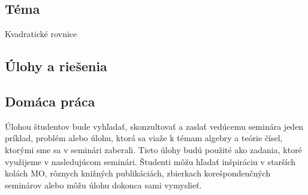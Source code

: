 
\subsection*{Téma}
Kvadratické rovnice

\subsection*{Úlohy a riešenia}















\subsection*{Domáca práca}

Úlohou študentov bude vyhľadať, skonzultovať a zaslať vedúcemu seminára jeden príklad, problém alebo úlohu, ktorá sa viaže k témam algebry a teórie čísel, ktorými sme sa v seminári zaberali. Tieto úlohy budú použité ako zadania, ktoré využijeme v nasledujúcom seminári. Študenti môžu hľadať inšpiráciu v starších kolách MO, rôznych knižných publikáciách, zbierkach korešpondenčných seminárov alebo môžu úlohu dokonca sami vymyslieť.



